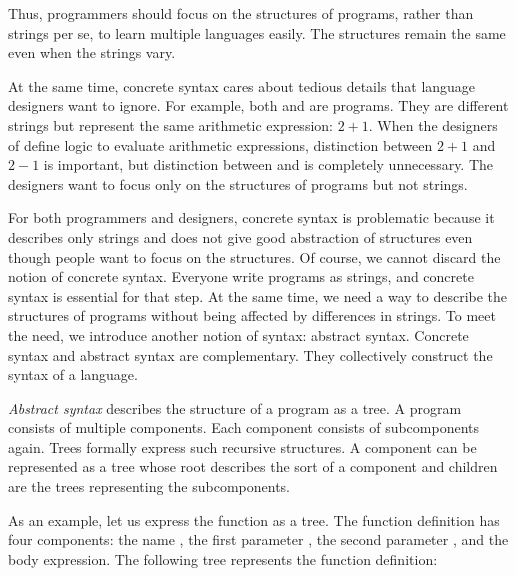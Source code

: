 Thus, programmers should focus on the structures of programs, rather
than strings per se, to learn multiple languages easily. The structures
remain the same even when the strings vary.

At the same time, concrete syntax cares about tedious details that
language designers want to ignore. For example, both  and
 are \Lang programs. They are different strings but
represent the same arithmetic expression: $2+1$. When the designers of
\Lang define logic to evaluate arithmetic expressions, distinction
between $2+1$ and $2-1$ is important, but distinction between
 and  is completely unnecessary. The
designers want to focus only on the structures of programs but not
strings.

For both programmers and designers, concrete syntax is problematic
because it describes only strings and does not give good abstraction of
structures even though people want to focus on the structures. Of
course, we cannot discard the notion of concrete syntax. Everyone write
programs as strings, and concrete syntax is essential for that step. At
the same time, we need a way to describe the structures of programs
without being affected by differences in strings. To meet the need, we
introduce another notion of syntax: abstract syntax. Concrete syntax and
abstract syntax are complementary. They collectively construct the
syntax of a language.

\textit{Abstract syntax} describes the structure of a program as a tree. A program
consists of multiple components. Each component consists of subcomponents again.
Trees formally express such recursive structures. A component can be represented
as a tree whose root describes the sort of a component and children are the
trees representing the subcomponents.

As an example, let us express the function  as a tree. The function
definition has four components: the name , the first parameter
, the second parameter , and the body expression. The following
tree represents the function definition:

\begin{center}
\end{center}

